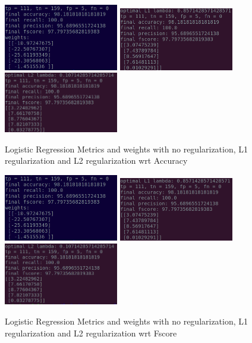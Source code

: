 \documentclass[a4paper,10pt,twocolumn]{article}
\begin{document}
\begin{figure}[h!]
\centering
\includegraphics[scale=1.0, width=5cm]{Fig3.png}
\includegraphics[scale=1.0, width=5cm]{Fig4.png}
\includegraphics[scale=1.0, width=5cm]{Fig5.png}
\caption*{Logistic Regression Metrics and weights with no regularization, L1 regularization and L2 regularization wrt Accuracy}
\end{figure}

\begin{figure}[h!]
\centering
\includegraphics[scale=1.0, width=5cm]{Fig3.png}
\includegraphics[scale=1.0, width=5cm]{Fig6.png}
\includegraphics[scale=1.0, width=5cm]{Fig7.png}
\caption*{Logistic Regression Metrics and weights with no regularization, L1 regularization and L2 regularization wrt Fscore}
\end{figure}
\end{document}
